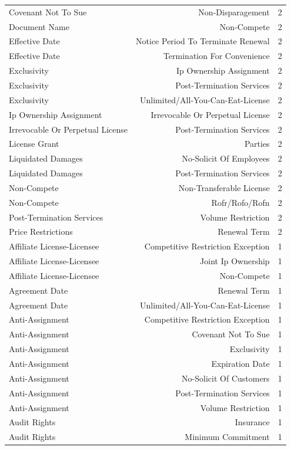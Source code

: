 \begin{tabular}{lrr}
Covenant Not To Sue & Non-Disparagement & 2 \\
Document Name & Non-Compete & 2 \\
Effective Date & Notice Period To Terminate Renewal & 2 \\
Effective Date & Termination For Convenience & 2 \\
Exclusivity & Ip Ownership Assignment & 2 \\
Exclusivity & Post-Termination Services & 2 \\
Exclusivity & Unlimited/All-You-Can-Eat-License & 2 \\
Ip Ownership Assignment & Irrevocable Or Perpetual License & 2 \\
Irrevocable Or Perpetual License & Post-Termination Services & 2 \\
License Grant & Parties & 2 \\
Liquidated Damages & No-Solicit Of Employees & 2 \\
Liquidated Damages & Post-Termination Services & 2 \\
Non-Compete & Non-Transferable License & 2 \\
Non-Compete & Rofr/Rofo/Rofn & 2 \\
Post-Termination Services & Volume Restriction & 2 \\
Price Restrictions & Renewal Term & 2 \\
Affiliate License-Licensee & Competitive Restriction Exception & 1 \\
Affiliate License-Licensee & Joint Ip Ownership & 1 \\
Affiliate License-Licensee & Non-Compete & 1 \\
Agreement Date & Renewal Term & 1 \\
Agreement Date & Unlimited/All-You-Can-Eat-License & 1 \\
Anti-Assignment & Competitive Restriction Exception & 1 \\
Anti-Assignment & Covenant Not To Sue & 1 \\
Anti-Assignment & Exclusivity & 1 \\
Anti-Assignment & Expiration Date & 1 \\
Anti-Assignment & No-Solicit Of Customers & 1 \\
Anti-Assignment & Post-Termination Services & 1 \\
Anti-Assignment & Volume Restriction & 1 \\
Audit Rights & Insurance & 1 \\
Audit Rights & Minimum Commitment & 1 \\

\end{tabular}
